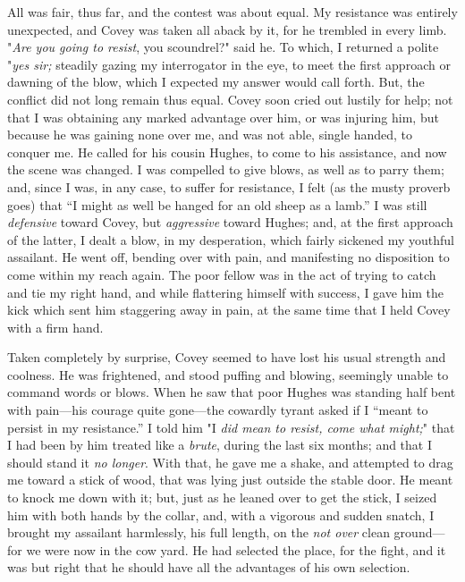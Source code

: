All was fair, thus far, and the contest was about equal. My resistance
was entirely unexpected, and Covey was taken all aback by it, for he
trembled in every limb. "\emph{Are you going to resist}, you scoundrel?"
said he. To which, I returned a polite "\emph{yes {sir;}} steadily
gazing my interrogator in the eye, to meet the first approach or dawning
of the blow, which I expected my answer would call forth. But, the
conflict did not long remain thus equal. Covey soon cried out lustily
for help; not that I was obtaining any marked advantage over him, or was
injuring him, but because he was gaining none over me, and was not able,
single handed, to conquer me. He called for his cousin Hughes, to come
to his assistance, and now the scene was changed. I was compelled to
give blows, as well as to parry them; and, since I was, in any case, to
suffer for resistance, I felt (as the musty proverb goes) that ``I might
as well be hanged for an old sheep as a lamb.'' I was still
\emph{defensive} toward Covey, but \emph{aggressive} toward Hughes; and,
at the first approach of the latter, I dealt a blow, in my desperation,
which fairly sickened my youthful assailant. He went off, bending over
with pain, and manifesting no disposition to come within my reach again.
The poor fellow was in the act of trying to catch and tie my right hand,
and while flattering himself with success, I gave him the kick which
sent him staggering away in pain, at the same time that I held Covey
with a firm hand.

Taken completely by surprise, Covey seemed to
{\protect\hypertarget{244}{}{}}have lost his usual strength and
coolness. He was frightened, and stood puffing and blowing, seemingly
unable to command words or blows. When he saw that poor Hughes was
standing half bent with pain---his courage quite gone---the cowardly
tyrant asked if I ``meant to persist in my resistance.'' I told him "I
\emph{did mean to resist, come what might;}" that I had been by him
treated like a \emph{brute}, during the last six months; and that I
should stand it \emph{no longer}. With that, he gave me a shake, and
attempted to drag me toward a stick of wood, that was lying just outside
the stable door. He meant to knock me down with it; but, just as he
leaned over to get the stick, I seized him with both hands by the
collar, and, with a vigorous and sudden snatch, I brought my assailant
harmlessly, his full length, on the \emph{not over} clean ground---for
we were now in the cow yard. He had selected the place, for the fight,
and it was but right that he should have all the advantages of his own
selection.

